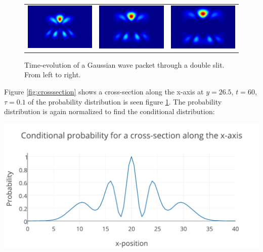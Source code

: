 \begin{figure}[H]
\begin{tabular}{ccc}
  \includegraphics[scale = 0.29]{slit10.png} &   \includegraphics[scale = 0.29]{slit11.png} &   \includegraphics[scale = 0.29]{slit12.png} \\
\end{tabular}
\caption{Time-evolution of a Gaussian wave packet through a double slit. From left to right.}
\label{fig:doubleslit}
\end{figure} Figure \ref{fig:crosssection} shows a cross-section along the x-axis at $y = 26.5$, $t = 60$, $\tau = 0.1$ of the probability distribution is seen figure \ref{fig:doubleslit}. The probability distribution is again normalized to find the conditional distribution:

\begin{Figure}
    \centerfloat
    \includegraphics[trim = 3.5mm 0mm 3.5mm 0mm, clip,scale = 0.395]{crosssectiondoubleslit.pdf}
    \label{fig:crosssection}
\end{Figure}
